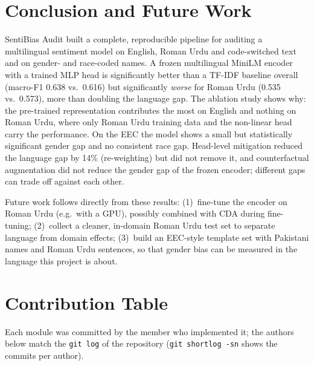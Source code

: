 \documentclass[11pt,a4paper]{article}
\begin{document}
\section{Conclusion and Future Work}
SentiBias Audit built a complete, reproducible pipeline for auditing a multilingual sentiment
model on English, Roman Urdu and code-switched text and on gender- and race-coded names. A
frozen multilingual MiniLM encoder with a trained MLP head is significantly better than a
TF-IDF baseline overall (macro-F1 0.638 vs.\ 0.616) but significantly \emph{worse} for Roman
Urdu (0.535 vs.\ 0.573), more than doubling the language gap. The ablation study shows why: the
pre-trained representation contributes the most on English and nothing on Roman Urdu, where
only Roman Urdu training data and the non-linear head carry the performance. On the EEC the
model shows a small but statistically significant gender gap and no consistent race gap. Head-level
mitigation reduced the language gap by 14\% (re-weighting) but did not remove it, and
counterfactual augmentation did not reduce the gender gap of the frozen encoder; different gaps
can trade off against each other.

Future work follows directly from these results: (1)~fine-tune the encoder on Roman Urdu
(e.g.\ with a GPU), possibly combined with CDA during fine-tuning; (2)~collect a cleaner,
in-domain Roman Urdu test set to separate language from domain effects; (3)~build an EEC-style
template set with Pakistani names and Roman Urdu sentences, so that gender bias can be measured
in the language this project is about.

\section{Contribution Table}
Each module was committed by the member who implemented it; the authors below match the
\texttt{git log} of the repository (\texttt{git shortlog -sn} shows the commits per author).
\end{document}
